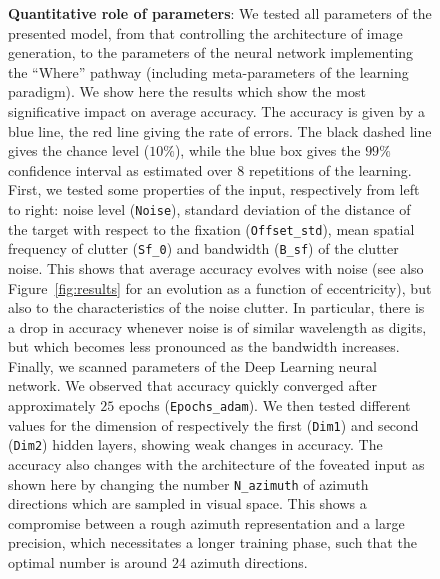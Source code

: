 \begin{figure}[t!]%
	\caption{
		{\bf Quantitative role of parameters}:
		We tested all parameters of the presented model, from that controlling the architecture of image generation, to the parameters of the neural network implementing the ``Where'' pathway (including meta-parameters of the learning paradigm). We show here the results which show the most significative impact on average accuracy. The accuracy is given by a blue line, the red line giving the rate of errors. The black dashed line gives the chance level ($10\%$), while the blue box gives the $99\%$ confidence interval as estimated over $8$ repetitions of the learning. %
		\A First, we tested some properties of the input, respectively from left to right: noise level (\texttt{Noise}), standard deviation  of the distance of the target with respect to the fixation (\texttt{Offset\_std}), mean spatial frequency of clutter (\texttt{Sf\_0}) and bandwidth (\texttt{B\_sf}) of the clutter noise. This shows that average accuracy evolves with noise (see also Figure~\ref{fig:results} for an evolution as a function of eccentricity), but also to the characteristics of the noise clutter. In particular, there is a drop in accuracy whenever noise is of similar wavelength as digits, but which becomes less pronounced as the bandwidth increases. %
		\B Finally, we scanned parameters of the Deep Learning neural network. We observed that accuracy quickly converged after approximately $25$ epochs (\texttt{Epochs\_adam}). We then tested different values for the dimension of respectively the first (\texttt{Dim1}) and second (\texttt{Dim2}) hidden layers, showing weak changes in accuracy. %
		\C The accuracy also changes with the architecture of the foveated input as shown here by changing the number \texttt{N\_azimuth} of azimuth directions which are sampled in visual space. This shows a compromise between a rough azimuth representation and a large precision, which necessitates a longer training phase, such that the optimal number is around $24$ azimuth directions. %
		\label{fig:params}}%
\end{figure}%
